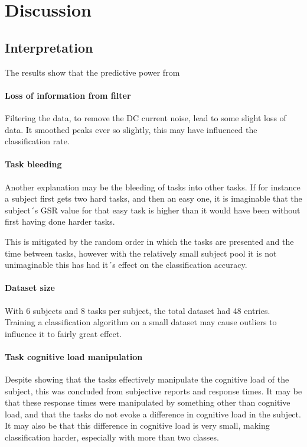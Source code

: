 \documentclass[12pt,leqno,letterpaper]{report} %
\begin{document}
\chapter{Discussion}
\section{Interpretation}
The results show that the predictive power from 


\citep{small}

\subsubsection{Loss of information from filter}
Filtering the data, to remove the DC current noise, lead to some slight loss of data. It smoothed peaks ever so slightly, this may have influenced the classification rate.


\subsubsection{Task bleeding}
Another explanation may be the bleeding of tasks into other tasks. If for instance a subject first gets two hard tasks, and then an easy one, it is imaginable that the subject´s GSR value for that easy task is higher than it would have been without first having done harder tasks. 

This is mitigated by the random order in which the tasks are presented and the time between tasks, however with the relatively small subject pool it is not unimaginable this has had it´s effect on the classification accuracy.

\subsubsection{Dataset size}
With 6 subjects and 8 tasks per subject, the total dataset had 48 entries. Training a classification algorithm on a small dataset may cause outliers to influence it to fairly great effect.

\subsubsection{Task cognitive load manipulation}
Despite \citep{Nourbakhsh2013} showing that the tasks effectively manipulate the cognitive load of the subject, this was concluded from subjective reports and response times. It may be that these response times were manipulated by something other than cognitive load, and that the tasks do not evoke a difference in cognitive load in the subject. It may also be that this difference in cognitive load is very small, making classification harder, especially with more than two classes.
\end{document}
